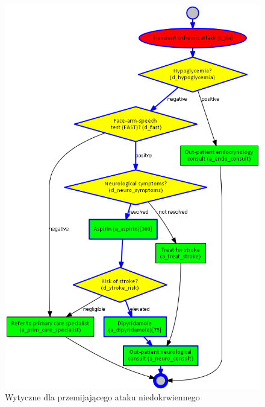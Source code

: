 \begin{figure}[H]
\centering
\includegraphics[scale=0.45]{img/tia.png}
\caption{Wytyczne dla przemijającego ataku niedokrwiennego}
\label{fig:tia}
\end{figure}

